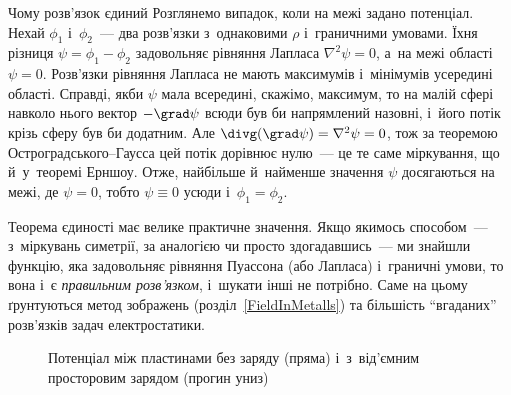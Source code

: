 \begin{Example}{Чому розв'язок єдиний}
	Розглянемо випадок, коли на межі задано потенціал. Нехай $\phi_1$ і~$\phi_2$~--- два
	розв'язки з~однаковими $\rho$ і~граничними умовами. Їхня різниця $\psi = \phi_1 -
		\phi_2$ задовольняє рівняння Лапласа $\nabla^2\psi = 0$, а~на межі області $\psi = 0$.
	Розв'язки рівняння
	Лапласа не мають максимумів і~мінімумів усередині області. Справді, якби $\psi$ мала
	всередині, скажімо, максимум, то на малій сфері навколо нього вектор $-\grad\psi$ всюди
	був би напрямлений назовні, і~його потік крізь сферу був би додатним. Але
	$\divg(\grad\psi) = \nabla^2\psi = 0$, тож за теоремою Остроградського--Гаусса цей
	потік дорівнює нулю~--- це те саме міркування, що й~у~теоремі Ерншоу. Отже, найбільше
	й~найменше значення $\psi$ досягаються на межі, де $\psi = 0$, тобто $\psi \equiv 0$
	усюди і~$\phi_1 = \phi_2$.
\end{Example}

Теорема єдиності має велике практичне значення. Якщо якимось способом~--- з~міркувань
симетрії, за аналогією чи просто здогадавшись~--- ми знайшли функцію, яка задовольняє
рівняння Пуассона (або Лапласа) і~граничні умови, то вона і~є \emph{правильним
	розв'язком}, і~шукати інші не потрібно. Саме на цьому ґрунтуються метод зображень
(розділ~\ref{FieldInMetalls}) та більшість \enquote{вгаданих} розв'язків задач
електростатики.

\begin{figure}
	\centering
	\caption{Потенціал між пластинами без заряду (пряма) і~з~від'ємним
		просторовим зарядом (прогин униз)}
	\label{tikz:SpaceCharge}
\end{figure}

